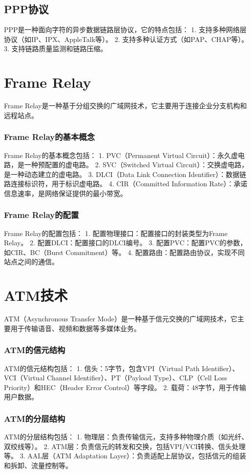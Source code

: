 \documentclass{book}
\begin{document}
\subsection{PPP协议}
PPP是一种面向字符的异步数据链路层协议，它的特点包括：
1. 支持多种网络层协议（如IP、IPX、AppleTalk等）。
2. 支持多种认证方式（如PAP、CHAP等）。
3. 支持链路质量监测和链路压缩。
\section{Frame Relay}
Frame Relay是一种基于分组交换的广域网技术，它主要用于连接企业分支机构和远程站点。
\subsubsection{Frame Relay的基本概念}
Frame Relay的基本概念包括：
1. PVC（Permanent Virtual Circuit）：永久虚电路，是一种预配置的虚电路。
2. SVC（Switched Virtual Circuit）：交换虚电路，是一种动态建立的虚电路。
3. DLCI（Data Link Connection Identifier）：数据链路连接标识符，用于标识虚电路。
4. CIR（Committed Information Rate）：承诺信息速率，是网络保证提供的最小带宽。
\subsubsection{Frame Relay的配置}
Frame Relay的配置包括：
1. 配置物理接口：配置接口的封装类型为Frame Relay。
2. 配置DLCI：配置接口的DLCI编号。
3. 配置PVC：配置PVC的参数，如CIR、BC（Burst Commitment）等。
4. 配置路由：配置路由协议，实现不同站点之间的通信。
\section{ATM技术}
ATM（Asynchronous Transfer Mode）是一种基于信元交换的广域网技术，它主要用于传输语音、视频和数据等多媒体业务。
\subsubsection{ATM的信元结构}
ATM的信元结构包括：
1. 信头：5字节，包含VPI（Virtual Path Identifier）、VCI（Virtual Channel Identifier）、PT（Payload Type）、CLP（Cell Loss Priority）和HEC（Header Error Control）等字段。
2. 载荷：48字节，用于传输用户数据。
\subsubsection{ATM的分层结构}
ATM的分层结构包括：
1. 物理层：负责传输信元，支持多种物理介质（如光纤、双绞线等）。
2. ATM层：负责信元的转发和交换，包括VPI/VCI转换、信头处理等。
3. AAL层（ATM Adaptation Layer）：负责适配上层协议，包括信元的组装和拆卸、流量控制等。
\end{document}
